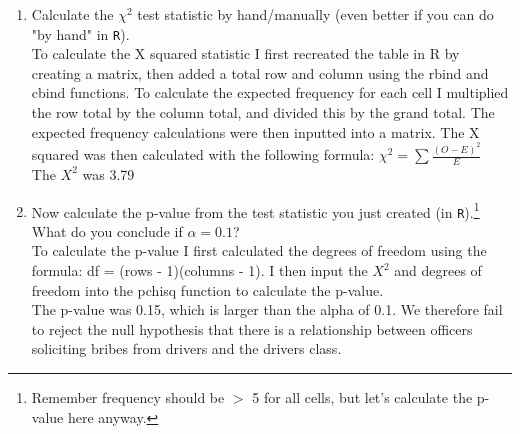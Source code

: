 \documentclass[12pt,letterpaper]{article}
\begin{document}
\begin{enumerate}
	
	\item [(a)]
	Calculate the $\chi^2$ test statistic by hand/manually (even better if you can do "by hand" in \texttt{R}).\\
	
	\noindent To calculate the X squared statistic I first recreated the table in R by creating a matrix, then added a total row and column using the rbind and cbind functions. To calculate the expected frequency for each cell I multiplied the row total by the column total, and divided this by the grand total. The expected frequency calculations were then inputted into a matrix. The X squared was then calculated with the following formula: $\chi^2 = \sum \frac{(O - E)^2}{E}$ \\
	
	  
	
	  
	
	  
	
	  
	
	\noindent The $X^2$ was 3.79\\
	
	\item [(b)]
	Now calculate the p-value from the test statistic you just created (in \texttt{R}).\footnote{Remember frequency should be $>$ 5 for all cells, but let's calculate the p-value here anyway.}  What do you conclude if $\alpha = 0.1$?\\
	
	\noindent To calculate the p-value I first calculated the degrees of freedom using the formula: df = (rows - 1)(columns - 1). I then input the $X^2$ and degrees of freedom into the pchisq function to calculate the p-value. \\
	
	  
	
	  
	
	\noindent The p-value was 0.15, which is larger than the alpha of 0.1. We therefore fail to reject the null hypothesis that there is a relationship between officers soliciting bribes from drivers and the drivers class. \\
	

\end{enumerate}
\end{document}
